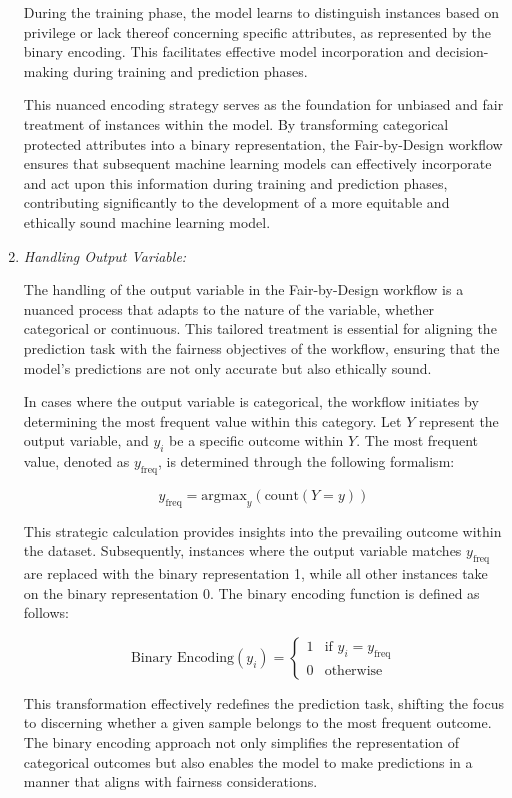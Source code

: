 \documentclass[12pt,a4paper,openright,twoside]{book}
\begin{document}
\begin{enumerate}
    During the training phase, the model learns to distinguish instances based on privilege or lack thereof concerning specific attributes, as represented by the binary encoding. This facilitates effective model incorporation and decision-making during training and prediction phases.

    This nuanced encoding strategy serves as the foundation for unbiased and fair treatment of instances within the model. By transforming categorical protected attributes into a binary representation, the Fair-by-Design workflow ensures that subsequent machine learning models can effectively incorporate and act upon this information during training and prediction phases, contributing significantly to the development of a more equitable and ethically sound machine learning model.

    \item \emph{Handling Output Variable:} 
    
    The handling of the output variable in the Fair-by-Design workflow is a nuanced process that adapts to the nature of the variable, whether categorical or continuous. This tailored treatment is essential for aligning the prediction task with the fairness objectives of the workflow, ensuring that the model's predictions are not only accurate but also ethically sound.


    In cases where the output variable is categorical, the workflow initiates by determining the most frequent value within this category. Let $Y$ represent the output variable, and $y_i$ be a specific outcome within $Y$. The most frequent value, denoted as $y_{\text{freq}}$, is determined through the following formalism:

    \[
    y_{\text{freq}} = \text{argmax}_y \left( \text{count}(Y = y) \right)
    \]

    This strategic calculation provides insights into the prevailing outcome within the dataset. Subsequently, instances where the output variable matches $y_{\text{freq}}$ are replaced with the binary representation 1, while all other instances take on the binary representation 0. The binary encoding function is defined as follows:

    \[
    \text{Binary Encoding}(y_i) = \begin{cases} 
    1 & \text{if } y_i = y_{\text{freq}} \\ 
    0 & \text{otherwise}
    \end{cases}
    \]

    This transformation effectively redefines the prediction task, shifting the focus to discerning whether a given sample belongs to the most frequent outcome. The binary encoding approach not only simplifies the representation of categorical outcomes but also enables the model to make predictions in a manner that aligns with fairness considerations.



\end{enumerate}
\end{document}
